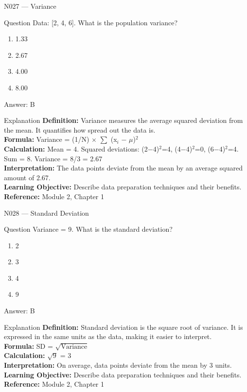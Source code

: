 \documentclass[aspectratio=169,8pt]{beamer}
\begin{document}
	\begin{frame}{N027 --- Variance}
		\begin{block}{Question}
			Data: [2, 4, 6]. What is the population variance?
			\begin{enumerate}
				\item 1.33
				\item 2.67
				\item 4.00
				\item 8.00
			\end{enumerate}
		\end{block}
		\begin{exampleblock}{Answer: B}\end{exampleblock}
		\begin{block}{Explanation}
			\textbf{Definition:} Variance measures the average squared deviation from the mean. It quantifies how spread out the data is.\\
			\textbf{Formula:} Variance = (1/N) $\times$ $\sum$ (x$_{i}$ $-$ $\mu$)$^{2}$\\
			\textbf{Calculation:} Mean = 4. Squared deviations: (2$-$4)$^{2}$=4, (4$-$4)$^{2}$=0, (6$-$4)$^{2}$=4. Sum = 8. Variance = 8/3 = 2.67\\
			\textbf{Interpretation:} The data points deviate from the mean by an average squared amount of 2.67.\\
			\textbf{Learning Objective:} Describe data preparation techniques and their benefits.\\
			\textbf{Reference:} Module 2, Chapter 1
		\end{block}
	\end{frame}
	
	\begin{frame}{N028 --- Standard Deviation}
		\begin{block}{Question}
			Variance = 9. What is the standard deviation?
			\begin{enumerate}
				\item 2
				\item 3
				\item 4
				\item 9
			\end{enumerate}
		\end{block}
		\begin{exampleblock}{Answer: B}\end{exampleblock}
		\begin{block}{Explanation}
			\textbf{Definition:} Standard deviation is the square root of variance. It is expressed in the same units as the data, making it easier to interpret.\\
			\textbf{Formula:} SD = $\sqrt{\text{Variance}}$\\
			\textbf{Calculation:} $\sqrt{9}$ = 3\\
			\textbf{Interpretation:} On average, data points deviate from the mean by 3 units.\\
			\textbf{Learning Objective:} Describe data preparation techniques and their benefits.\\
			\textbf{Reference:} Module 2, Chapter 1
		\end{block}
	\end{frame}
	
\end{document}
